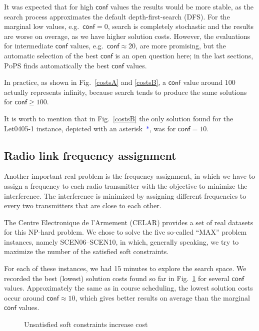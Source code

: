 \documentclass{ws-ijait}
\begin{document}
It was expected that for high $\mathsf{conf}$ values the
results would be more stable, as the search process
approximates the default depth-first-search (DFS). For the
marginal low values, e.g.\ $\mathsf{conf} = 0$, search is
completely stochastic and the results are worse on overage,
as we have higher solution costs. However, the evaluations
for intermediate $\mathsf{conf}$ values, e.g.\ 
$\mathsf{conf} \approx 20$, are more promising, but the
automatic selection of the best $\mathsf{conf}$ is an open
question here; in the last sections, \textsc{PoPS} finds
automatically the best $\mathsf{conf}$ values.

In practice, as shown in Fig.\ \ref{costsA} and
\ref{costsB}, a $\mathsf{conf}$ value around $100$ actually
represents infinity, because search tends to produce the
same solutions for $\mathsf{conf} \geq 100$.

It is worth to mention that in Fig.~\ref{costsB} the only
solution found for the \textsf{Let0405-1} instance, depicted
with an asterisk~\textcolor{blue}{$*$}, was for
$\mathsf{conf} = 10$.

\subsection{Radio link frequency assignment}

Another important real problem is the frequency assignment,
in which we have to assign a frequency to each radio
transmitter with the objective to minimize the interference.
The interference is minimized by assigning different
frequencies to every two transmitters that are close to each
other.

The Centre Electronique de l'Armement (CELAR) provides a set
of real datasets for this NP-hard problem.\cite{radio-link}
We chose to solve the five so-called ``MAX'' problem
instances, namely \textsf{SCEN06}--\textsf{SCEN10}, in
which, generally speaking, we try to maximize the number of
the satisfied soft constraints.

For each of these instances, we had 15 minutes to explore
the search space. We recorded the best (lowest) solution
costs found so far in Fig.~\ref{CELAR} for several
$\mathsf{conf}$ values. Approximately the same as in course
scheduling, the lowest solution costs occur around
$\mathsf{conf} \approx 10$, which gives better results on
average than the marginal $\mathsf{conf}$ values.

\begin{figure}
  \centering
  
  \caption{Unsatisfied soft constraints increase
           cost\label{CELAR}}
\end{figure}
\end{document}
